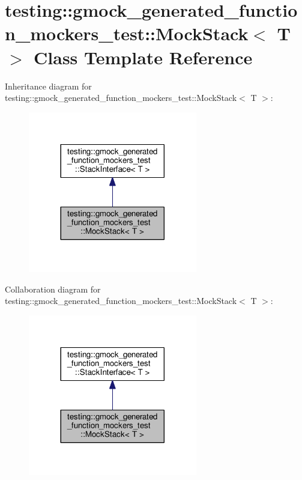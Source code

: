 \hypertarget{classtesting_1_1gmock__generated__function__mockers__test_1_1MockStack}{}\section{testing\+:\+:gmock\+\_\+generated\+\_\+function\+\_\+mockers\+\_\+test\+:\+:Mock\+Stack$<$ T $>$ Class Template Reference}
\label{classtesting_1_1gmock__generated__function__mockers__test_1_1MockStack}


Inheritance diagram for testing\+:\+:gmock\+\_\+generated\+\_\+function\+\_\+mockers\+\_\+test\+:\+:Mock\+Stack$<$ T $>$\+:
\nopagebreak
\begin{figure}[H]
\begin{center}
\leavevmode
\includegraphics[width=209pt]{classtesting_1_1gmock__generated__function__mockers__test_1_1MockStack__inherit__graph}
\end{center}
\end{figure}


Collaboration diagram for testing\+:\+:gmock\+\_\+generated\+\_\+function\+\_\+mockers\+\_\+test\+:\+:Mock\+Stack$<$ T $>$\+:
\nopagebreak
\begin{figure}[H]
\begin{center}
\leavevmode
\includegraphics[width=209pt]{classtesting_1_1gmock__generated__function__mockers__test_1_1MockStack__coll__graph}
\end{center}
\end{figure}
